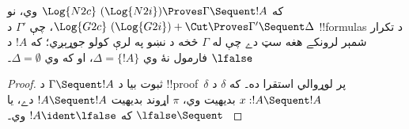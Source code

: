 \documentclass[../../../include/open-logic-section]{subfiles}
\begin{document}


\begin{prop}
که $\Log{N2c}\ (\Log{N2i}) \Proves \Gamma \Sequent !A$ وي، نو
$\Log{G2c}\ (\Log{G2i}) + \Cut \Proves \Gamma' \Sequent \Delta$،
چې $\Gamma'$ د !!{formula}s د تکرار شمېر لرونکے هغه سټ دے
چې له $\Gamma$ څخه د نښو په لرې کولو جوړېږي؛ که $!A$ د
$\lfalse$ فارمول نۀ وي $\Delta = \{!A\}$، او که وي
$\Delta = \emptyset$۔
\end{prop}

\begin{proof}
ثبوت بيا د $\Gamma \Sequent !A$ د !!{proof}~$\delta$ پر
لوړوالي استقرا ده۔ که $\delta$ د $x:!A \Sequent !A$
بديهيت وي، $\pi$ اړوند بديهيت $!A \Sequent !A$ دے، يا
$\lfalse \Sequent \ $ که $!A \ident \lfalse$ وي۔


\end{proof}
\end{document}
